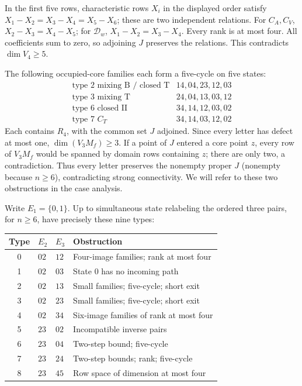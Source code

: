 \documentclass[11pt]{article}
\theoremstyle{definition}
\theoremstyle{plain}
\begin{document}
In the first five rows, characteristic rows \(X_i\) in the displayed
order satisfy \(X_1-X_2=X_3-X_4=X_5-X_6\); these are two independent
relations. For \(C_A,C_V\), \(X_2-X_3=X_4-X_5\); for \(\mathcal D_w\),
\(X_1-X_2=X_3-X_4\). Every rank is at most four. All coefficients sum to
zero, so adjoining \(J\) preserves the relations. This contradicts
\(\dim V_4\ge5\).

The following occupied-core families each form a five-cycle on five
states: \[
\begin{array}{c|l}
\text{type 2 mixing B / closed T}&14,04,23,12,03\\
\text{type 3 mixing T}&24,04,13,03,12\\
\text{type 6 closed II}&34,14,12,03,02\\
\text{type 7 }C_T&34,14,03,12,02
\end{array}
\] Each contains \(R_4\), with the common set \(J\) adjoined. Since
every letter has defect at most one, \(\dim(V_3M_f)\ge3\). If a
point of \(J\) entered a core point \(z\), every row of \(V_3M_f\)
would be spanned by domain rows containing \(z\); there are only two,
a contradiction. Thus every letter preserves the nonempty proper
\(J\) (nonempty because \(n\ge6\)), contradicting strong connectivity.
We will refer to these two obstructions in the case analysis.

Write \(E_1=\{0,1\}\). Up to simultaneous state relabeling the ordered
three pairs, for \(n\ge 6\), have precisely these nine types:

\begin{center}\small
\begin{tabular}{clll}
\toprule
Type & $E_2$ & $E_3$ & Obstruction\\\midrule
0 & $02$ & $12$ & Four-image families; rank at most four\\
1 & $02$ & $03$ & State $0$ has no incoming path\\
2 & $02$ & $13$ & Small families; five-cycle; short exit\\
3 & $02$ & $23$ & Small families; five-cycle; short exit\\
4 & $02$ & $34$ & Six-image families of rank at most four\\
5 & $23$ & $02$ & Incompatible inverse pairs\\
6 & $23$ & $04$ & Two-step bound; five-cycle\\
7 & $23$ & $24$ & Two-step bounds; rank; five-cycle\\
8 & $23$ & $45$ & Row space of dimension at most four\\\bottomrule
\end{tabular}
\end{center}
\end{document}
